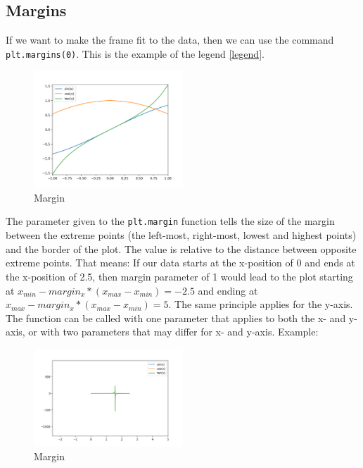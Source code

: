 \documentclass[10pt,a4paper]{article}
\newcommand{\te}{\texttt}
\begin{document}
\subsection{Margins}
If we want to make the frame fit to the data, then we can use the command \te{plt.margins(0)}. This is the example of the legend \ref{legend}.


\begin{figure}[h]\centering
\caption{Margin}
\includegraphics[width=0.5\textwidth]{margin.png}
\end{figure}

The parameter given to the \te{plt.margin} function tells the size of the margin between the extreme points (the left-most, right-most, lowest and highest points) and the border of the plot. The value is relative to the distance between opposite extreme points. That means: If our data starts at the x-position of 0 and ends at the x-position of 2.5, then margin parameter of 1 would lead to the plot starting at $x_{min}-margin_x*(x_{max}-x_{min}) = -2.5$ and ending at $x_{max}-margin_x*(x_{max}-x_{min}) = 5$. The same principle applies for the y-axis. The function can be called with one parameter that applies to both the x- and y-axis, or with two parameters that may differ for x- and y-axis.
Example:




\begin{figure}[h]\centering
\caption{Margin}
\includegraphics[width=0.5\textwidth]{margin1.png}
\end{figure}
\end{document}
